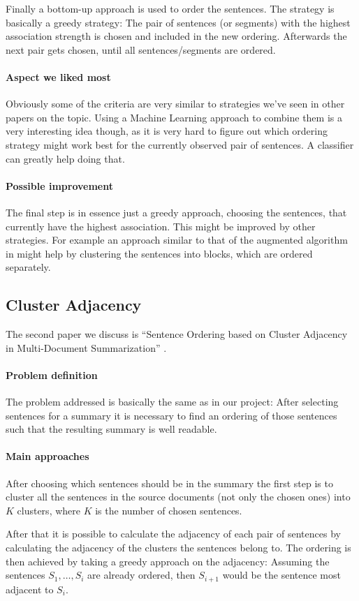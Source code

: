 \documentclass[11pt]{article}
\begin{document}
Finally a bottom-up approach is used to order the sentences. The strategy is basically a greedy
strategy: The pair of sentences (or segments) with the highest association strength is chosen and
included in the new ordering. Afterwards the next pair gets chosen, until all sentences/segments are
ordered.
\paragraph{Aspect we liked most} Obviously some of the criteria are very similar to strategies we've
seen in other papers on the topic. Using a Machine Learning approach to combine them is a very
interesting idea though, as it is very hard to figure out which ordering strategy might work best
for the currently observed pair of sentences. A classifier can greatly help doing that.
\paragraph{Possible improvement} The final step is in essence just a greedy approach, choosing the
sentences, that currently have the highest association. This might be improved by other strategies.
For example an approach similar to that of the augmented algorithm in \cite{BarzilayEM02} might help
by clustering the sentences into blocks, which are ordered separately.
\subsection{Cluster Adjacency}
The second paper we discuss is ``Sentence Ordering based on Cluster Adjacency in Multi-Document
Summarization'' \cite{DonghongY08}.
\paragraph{Problem definition} The problem addressed is basically the same as in our project: After
selecting sentences for a summary it is necessary to find an ordering of those sentences such that
the resulting summary is well readable.
\paragraph{Main approaches} After choosing which sentences should be in the summary the first step
is to cluster all the sentences in the source documents (not only the chosen ones) into $K$
clusters, where $K$ is the number of chosen sentences.

After that it is possible to calculate the adjacency of each pair of sentences by calculating the
adjacency of the clusters the sentences belong to. The ordering is then achieved by taking a greedy
approach on the adjacency: Assuming the sentences $S_1,\ldots,S_i$ are already ordered, then
$S_{i+1}$ would be the sentence most adjacent to $S_i$.
\end{document}
